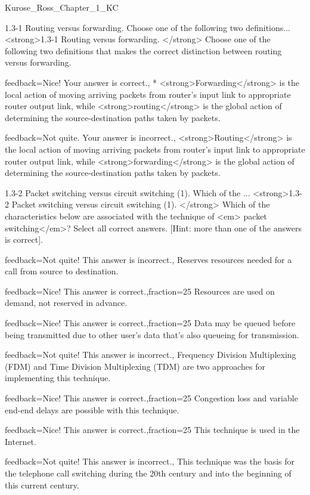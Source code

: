\documentclass[a4paper,twocolumn]{article}
\begin{document}
\begin{quiz}{Kurose_Ross_Chapter_1_KC}
\begin{multi}[
	points=1,
	penalty=0.33333,
]{1.3-1 Routing versus forwarding.  Choose one of the following two definitions...}
<strong>1.3-1 Routing versus forwarding. </strong> Choose one of the following two definitions that makes the correct distinction between routing versus forwarding.
\item[feedback={Nice! Your answer is correct.},]* <strong>Forwarding</strong> is the local action of moving arriving packets from router’s input link to appropriate router output link, while <strong>routing</strong> is the global action of determining the source-destination paths taken by packets.
\item[feedback={Not quite. Your answer is incorrect.},] <strong>Routing</strong> is the local action of moving arriving packets from router’s input link to appropriate router output link, while <strong>forwarding</strong> is the global action of determining the source-destination paths taken by packets.
\end{multi}

\begin{multi}[
	points=1,
	penalty=0.33333,
	multiple,
]{1.3-2 Packet switching versus circuit switching (1).  Which of the ...}
<strong>1.3-2 Packet switching versus circuit switching (1). </strong> Which of the characteristics below are associated with the technique of <em> packet switching</em>? Select all correct answers. [Hint: more than one of the answers is correct].
\item[feedback={Not quite! This answer is incorrect.},] Reserves resources needed for a call from source to destination.
\item[feedback={Nice! This answer is correct.},fraction=25] Resources are used on demand, not reserved in advance.
\item[feedback={Nice! This answer is correct.},fraction=25] Data may be queued before being transmitted due to other user’s data that’s also queueing for transmission.
\item[feedback={Not quite! This answer is incorrect.},] Frequency Division Multiplexing (FDM) and Time Division Multiplexing (TDM) are two approaches for implementing this technique.
\item[feedback={Nice! This answer is correct.},fraction=25] Congestion loss and variable end-end delays are possible with this technique.
\item[feedback={Nice! This answer is correct.},fraction=25] This technique is used in the Internet.
\item[feedback={Not quite! This answer is incorrect.},] This technique was the basis for the telephone call switching during the 20th century and into the beginning of this current century.
\end{multi}


\end{quiz}
\end{document}
